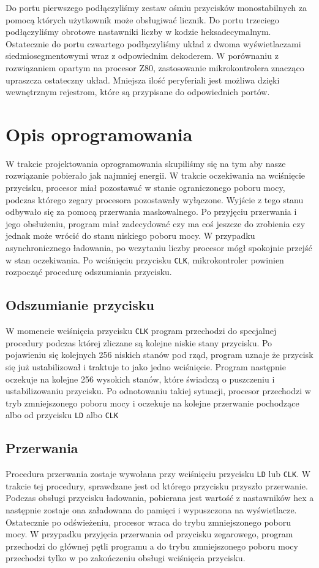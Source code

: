 \documentclass[a4paper,titlepage,11pt,floatssmall]{mwrep}
\begin{document}
Do portu pierwszego podłączyliśmy zestaw ośmiu przycisków monostabilnych za pomocą których użytkownik może obsługiwać licznik. Do portu trzeciego podłączyliśmy obrotowe nastawniki liczby w kodzie heksadecymalnym. Ostatecznie do portu czwartego podłączyliśmy układ z dwoma wyświetlaczami siedmiosegmentowymi wraz z odpowiednim dekoderem. W porównaniu z rozwiązaniem opartym na procesor Z80, zastosowanie mikrokontrolera znacząco upraszcza ostateczny układ. Mniejsza ilość peryferiali jest możliwa dzięki wewnętrznym rejestrom, które są przypisane do odpowiednich portów.

\section{Opis oprogramowania}
\indent W trakcie projektowania oprogramowania skupiliśmy się na tym aby nasze rozwiązanie pobierało jak najmniej energii. W trakcie oczekiwania na wciśnięcie przycisku, procesor miał pozostawać w stanie ograniczonego poboru mocy, podczas którego zegary procesora pozostawały wyłączone. Wyjście z tego stanu odbywało się za pomocą przerwania maskowalnego. Po przyjęciu przerwania i jego obsłużeniu, program miał zadecydować czy ma coś jeszcze do zrobienia czy jednak może wrócić do stanu niskiego poboru mocy. W przypadku asynchronicznego ładowania, po wczytaniu liczby procesor mógł spokojnie przejść w stan oczekiwania. Po wciśnięciu przycisku \texttt{CLK}, mikrokontroler powinien rozpocząć procedurę odszumiania przycisku.

\subsection{Odszumianie przycisku}
\indent W momencie wciśnięcia przycisku \texttt{CLK} program przechodzi do specjalnej procedury podczas której zliczane są kolejne niskie stany przycisku. Po pojawieniu się kolejnych 256 niskich stanów pod rząd, program uznaje że przycisk się już ustabilizował i traktuje to jako jedno wciśnięcie. Program następnie oczekuje na kolejne 256 wysokich stanów, które świadczą o puszczeniu i ustabilizowaniu przycisku. Po odnotowaniu takiej sytuacji, procesor przechodzi w tryb zmniejszonego poboru mocy i oczekuje na kolejne przerwanie pochodzące albo od przycisku \texttt{LD} albo \texttt{CLK}

\subsection{Przerwania}
\indent Procedura przerwania zostaje wywołana przy wciśnięciu przycisku \texttt{LD} lub \texttt{CLK}. W trakcie tej procedury, sprawdzane jest od którego przycisku przyszło przerwanie. Podczas obsługi przycisku ładowania, pobierana jest wartość z nastawników hex a następnie zostaje ona załadowana do pamięci i wypuszczona na wyświetlacze. Ostatecznie po odświeżeniu, procesor wraca do trybu zmniejszonego poboru mocy. W przypadku przyjęcia przerwania od przycisku zegarowego, program przechodzi do głównej pętli programu a do trybu zmniejszonego poboru mocy przechodzi tylko w po zakończeniu obsługi wciśnięcia przycisku.
\end{document}
